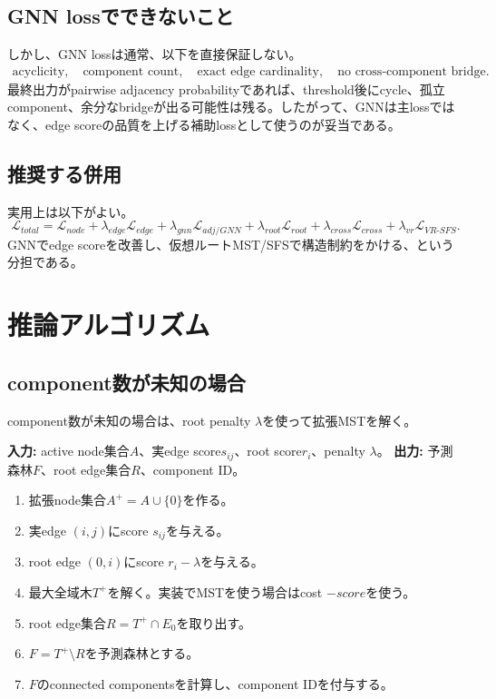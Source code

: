\documentclass[11pt,a4paper]{article}
\begin{document}
\subsection{GNN lossでできないこと}
しかし、GNN lossは通常、以下を直接保証しない。
\begin{align}
  \text{acyclicity},\quad
  \text{component count},\quad
  \text{exact edge cardinality},\quad
  \text{no cross-component bridge}.
\end{align}
最終出力がpairwise adjacency probabilityであれば、threshold後にcycle、孤立component、余分なbridgeが出る可能性は残る。したがって、GNNは主lossではなく、edge scoreの品質を上げる補助lossとして使うのが妥当である。

\subsection{推奨する併用}
実用上は以下がよい。
\begin{equation}
  \mathcal{L}_{total}
  =
  \mathcal{L}_{node}
  +\lambda_{edge}\mathcal{L}_{edge}
  +\lambda_{gnn}\mathcal{L}_{adj/GNN}
  +\lambda_{root}\mathcal{L}_{root}
  +\lambda_{cross}\mathcal{L}_{cross}
  +\lambda_{vr}\mathcal{L}_{VR\text{-}SFS}.
\end{equation}
GNNでedge scoreを改善し、仮想ルートMST/SFSで構造制約をかける、という分担である。

\section{推論アルゴリズム}
\subsection{component数が未知の場合}
component数が未知の場合は、root penalty $\lambda$を使って拡張MSTを解く。

\textbf{入力:} active node集合$A$、実edge score$s_{ij}$、root score$r_i$、penalty $\lambda$。
\textbf{出力:} 予測森林$F$、root edge集合$R$、component ID。

\begin{enumerate}
  \item 拡張node集合$A^+=A\cup\{0\}$を作る。
  \item 実edge $(i,j)$にscore $s_{ij}$を与える。
  \item root edge $(0,i)$にscore $r_i-\lambda$を与える。
  \item 最大全域木$T^+$を解く。実装でMSTを使う場合はcost $-score$を使う。
  \item root edge集合$R=T^+\cap E_0$を取り出す。
  \item $F=T^+\setminus R$を予測森林とする。
  \item $F$のconnected componentsを計算し、component IDを付与する。
\end{enumerate}
\end{document}
